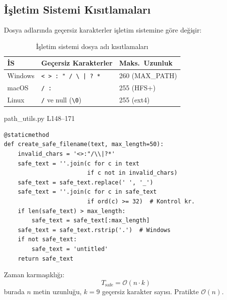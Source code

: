 \subsection{\.{I}\c{s}letim Sistemi K{\i}s{\i}tlamalar{\i}}

Dosya adlar{\i}nda ge\c{c}ersiz karakterler i\c{s}letim sistemine g\"{o}re de\u{g}i\c{s}ir:

\begin{table}[H]
\centering
\caption{\.{I}\c{s}letim sistemi dosya ad{\i} k{\i}s{\i}tlamalar{\i}}
\label{tab:filename_restrictions}
\begin{tabularx}{\textwidth}{lXl}
\toprule
\color{chapterBlue}\textbf{\.{I}S} & \color{chapterBlue}\textbf{Ge\c{c}ersiz Karakterler} & \color{chapterBlue}\textbf{Maks.\ Uzunluk} \\
\midrule
Windows & \texttt{< > : " / \textbackslash\ | ? *}  & 260 (MAX\_PATH) \\
macOS   & \texttt{/ :}                               & 255 (HFS+) \\
Linux   & \texttt{/} ve null (\texttt{\textbackslash 0}) & 255 (ext4) \\
\bottomrule
\end{tabularx}
\end{table}

\begin{kodref}{path\_utils.py L148--171}
\begin{lstlisting}[caption={G\"{u}venli dosya ad{\i} \"{u}retimi}]
@staticmethod
def create_safe_filename(text, max_length=50):
    invalid_chars = '<>:"/\\|?*'
    safe_text = ''.join(c for c in text
                        if c not in invalid_chars)
    safe_text = safe_text.replace(' ', '_')
    safe_text = ''.join(c for c in safe_text
                        if ord(c) >= 32)  # Kontrol kr.
    if len(safe_text) > max_length:
        safe_text = safe_text[:max_length]
    safe_text = safe_text.rstrip('.')  # Windows
    if not safe_text:
        safe_text = 'untitled'
    return safe_text
\end{lstlisting}
\end{kodref}

Zaman karma\c{s}{\i}kl{\i}\u{g}{\i}:
\begin{equation}
\label{eq:safe_filename_complexity}
T_{\text{safe}} = \mathcal{O}(n \cdot k)
\end{equation}
burada $n$ metin uzunlu\u{g}u, $k = 9$ ge\c{c}ersiz karakter say{\i}s{\i}. Pratikte $\mathcal{O}(n)$.

